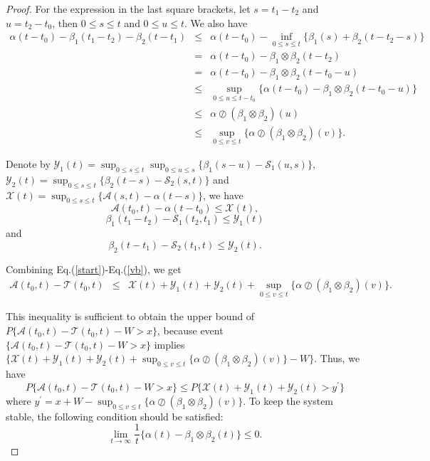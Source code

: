 \documentclass[12pt]{article}
\newtheorem{proof}{Proof}
\begin{document}
\begin{proof}
For the expression in the last square brackets, let $s=t_{1}-t_{2}$ and $u=t_{2}-t_{0}$, then $0\leq s\leq t$ and $0\leq u\leq t$. We also have
\begin{eqnarray}
  \alpha(t-t_{0})-\beta_1(t_{1}-t_{2})-\beta_2(t-t_1)&\leq &\alpha(t-t_{0})-\inf_{0\leq s\leq t}\{\beta_1(s)+\beta_2(t-t_2-s)\}\nonumber\\
  &=&\alpha(t-t_{0})-\beta_1\otimes\beta_2(t-t_{2})\nonumber\\
  &=&\alpha(t-t_{0})-\beta_1\otimes\beta_2(t-t_{0}-u)\nonumber\\
  &\leq & \sup_{0\leq u\leq t-t_0}\{\alpha(t-t_0)-\beta_1\otimes\beta_2(t-t_0-u)\}\nonumber\\
  &\leq& \alpha\oslash(\beta_1\otimes\beta_2)(u)\nonumber\\
  &\leq & \sup_{0\leq v\leq t}\{\alpha\oslash(\beta_1\otimes\beta_2)(v)\}.\label{curve}
\end{eqnarray}

Denote by $\mathcal{Y}_1(t)=\sup_{0\leq s\leq t}\sup_{0\leq u\leq s}\{\beta_1(s-u)-\mathcal{S}_1(u,s)\}$, $\mathcal{Y}_2(t)=\sup_{0\leq s\leq t}\{\beta_2(t-s)-\mathcal{S}_2(s,t)\}$ and $\mathcal{X}(t)=\sup_{0\leq s\leq t}\{\mathcal{A}(s,t)-\alpha(t-s)\}$, we have
\begin{equation}\label{vbc}
\mathcal{A}(t_{0},t)-\alpha(t-t_{0})\leq \mathcal{X}(t),
\end{equation}
\begin{equation}\label{mb}
\beta_1(t_1-t_{2})-\mathcal{S}_1(t_{2},t_1)\leq \mathcal{Y}_1(t)
\end{equation}
and
\begin{equation}\label{vb}
\beta_2(t-t_{1})-\mathcal{S}_2(t_{1},t)\leq \mathcal{Y}_2(t).
\end{equation}

Combining Eq.(\ref{start})-Eq.(\ref{vb}), we get
\begin{eqnarray*}
\mathcal{A}(t_0,t)-\mathcal{T}(t_0,t) &\leq& \mathcal{X}(t)+\mathcal{Y}_1(t)+\mathcal{Y}_2(t)+\sup_{0\leq v\leq t}\{\alpha\oslash(\beta_1\otimes\beta_2)(v)\}.
\end{eqnarray*}

This inequality is sufficient to obtain the upper bound of $P\{\mathcal{A}(t_0,t)-\mathcal{T}(t_0,t)-W>x\}$, because event $\{\mathcal{A}(t_0,t)-\mathcal{T}(t_0,t)-W>x\}$ implies $\{\mathcal{X}(t)+\mathcal{Y}_1(t)+\mathcal{Y}_2(t)+\sup_{0\leq v\leq t}\{\alpha\oslash(\beta_1\otimes\beta_2)(v)\}-W\}$. Thus, we have
$$P\{\mathcal{A}(t_0,t)-\mathcal{T}(t_0,t)-W>x\}\leq P\{\mathcal{X}(t)+\mathcal{Y}_1(t)+\mathcal{Y}_2(t)>y^\prime\}$$
where $y^\prime=x+W-\sup_{0\leq v\leq t}\{\alpha\oslash(\beta_1\otimes\beta_2)(v)\}$. To keep the system stable, the following condition should be satisfied:
$$\lim_{t\to \infty}\frac{1}{t}\{\alpha(t)-\beta_1\otimes\beta_2(t)\}\leq 0.$$


\end{proof}
\end{document}
